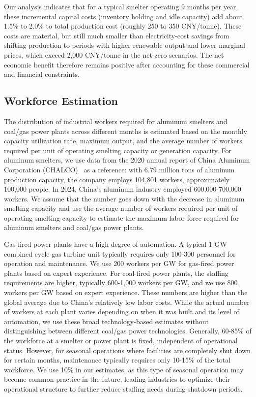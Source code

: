 \documentclass[preprint,12pt]{elsarticle}
\begin{document}
Our analysis indicates that for a typical smelter operating 9 months per year, these incremental capital costs (inventory holding and idle capacity) add about 1.5\% to 2.0\% to total production cost (roughly 250 to 350 CNY/tonne). These costs are material, but still much smaller than electricity-cost savings from shifting production to periods with higher renewable output and lower marginal prices, which exceed 2,000 CNY/tonne in the net-zero scenarios. The net economic benefit therefore remains positive after accounting for these commercial and financial constraints.

\subsection{Workforce Estimation}

The distribution of industrial workers required for aluminum smelters and coal/gas power plants across different months is estimated based on the monthly capacity utilization rate, maximum output, and the average number of workers required per unit of operating smelting capacity or generation capacity. For aluminum smelters, we use data from the 2020 annual report of China Aluminum Corporation (CHALCO)~\citep{CHALCO2020AnnualReport} as a reference: with 6.79 million tons of aluminum production capacity, the company employs 104,801 workers, approximately 100,000 people. In 2024, China's aluminum industry employed 600,000-700,000 workers. We assume that the number goes down with the decrease in aluminum smelting capacity and use the average number of workers required per unit of operating smelting capacity to estimate the maximum labor force required for aluminum smelters and coal/gas power plants.

Gas-fired power plants have a high degree of automation. A typical 1 GW combined cycle gas turbine unit typically requires only 100-300 personnel for operation and maintenance. We use 200 workers per GW for gas-fired power plants based on expert experience. For coal-fired power plants, the staffing requirements are higher, typically 600-1,000 workers per GW, and we use 800 workers per GW based on expert experience. These numbers are higher than the global average due to China's relatively low labor costs. While the actual number of workers at each plant varies depending on when it was built and its level of automation, we use these broad technology-based estimates without distinguishing between different coal/gas power technologies. Generally, 60-85\% of the workforce at a smelter or power plant is fixed, independent of operational status. However, for seasonal operations where facilities are completely shut down for certain months, maintenance typically requires only 10-15\% of the total workforce. We use 10\% in our estimates, as this type of seasonal operation may become common practice in the future, leading industries to optimize their operational structure to further reduce staffing needs during shutdown periods.
\end{document}
